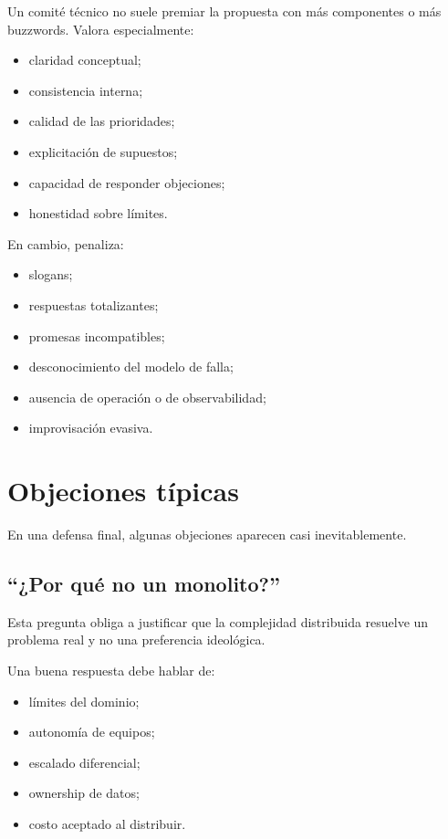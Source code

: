 \documentclass[variant=apuntes,cover=institutional,mode=screen]{ua-engineering-v6-article}
\begin{document}
Un comité técnico no suele premiar la propuesta con más componentes o más buzzwords. Valora especialmente:

\begin{itemize}
\item claridad conceptual;
\item consistencia interna;
\item calidad de las prioridades;
\item explicitación de supuestos;
\item capacidad de responder objeciones;
\item honestidad sobre límites.
\end{itemize}

En cambio, penaliza:
\begin{itemize}
\item slogans;
\item respuestas totalizantes;
\item promesas incompatibles;
\item desconocimiento del modelo de falla;
\item ausencia de operación o de observabilidad;
\item improvisación evasiva.
\end{itemize}

\section{Objeciones típicas}

En una defensa final, algunas objeciones aparecen casi inevitablemente.

\subsection{“¿Por qué no un monolito?”}

Esta pregunta obliga a justificar que la complejidad distribuida resuelve un problema real y no una preferencia ideológica.

Una buena respuesta debe hablar de:
\begin{itemize}
\item límites del dominio;
\item autonomía de equipos;
\item escalado diferencial;
\item ownership de datos;
\item costo aceptado al distribuir.
\end{itemize}
\end{document}
